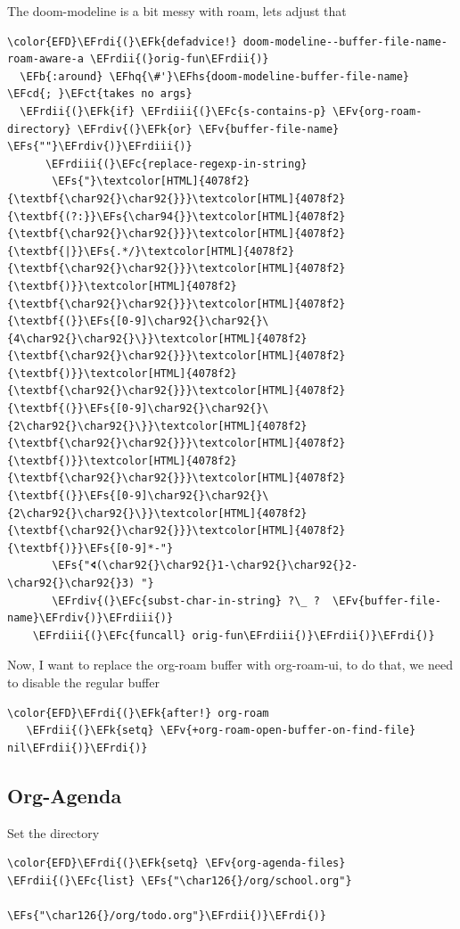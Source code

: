 \documentclass{scrartcl}
\newcommand{\EFk}[1]{\textcolor{EFk}{#1}} %
\newcommand{\EFs}[1]{\textcolor{EFs}{#1}} %
\newcommand{\EFb}[1]{\textcolor{EFb}{#1}} %
\newcommand{\EFct}[1]{\textcolor{EFct}{#1}} %
\newcommand{\EFc}[1]{\textcolor{EFc}{#1}} %
\newcommand{\EFv}[1]{\textcolor{EFv}{#1}} %
\newcommand{\EFcd}[1]{\textcolor{EFcd}{#1}} %
\newcommand{\EFhq}[1]{\textcolor{EFhq}{#1}} %
\newcommand{\EFhs}[1]{\textcolor{EFhs}{#1}} %
\newcommand{\EFrdi}[1]{\textcolor{EFrdi}{#1}} %
\newcommand{\EFrdii}[1]{\textcolor{EFrdii}{#1}} %
\newcommand{\EFrdiii}[1]{\textcolor{EFrdiii}{#1}} %
\newcommand{\EFrdiv}[1]{\textcolor{EFrdiv}{#1}} %
\begin{document}
The doom-modeline is a bit messy with roam, lets adjust that
\begin{Code}
\begin{Verbatim}[]
\color{EFD}\EFrdi{(}\EFk{defadvice!} doom-modeline--buffer-file-name-roam-aware-a \EFrdii{(}orig-fun\EFrdii{)}
  \EFb{:around} \EFhq{\#'}\EFhs{doom-modeline-buffer-file-name} \EFcd{; }\EFct{takes no args}
  \EFrdii{(}\EFk{if} \EFrdiii{(}\EFc{s-contains-p} \EFv{org-roam-directory} \EFrdiv{(}\EFk{or} \EFv{buffer-file-name} \EFs{""}\EFrdiv{)}\EFrdiii{)}
      \EFrdiii{(}\EFc{replace-regexp-in-string}
       \EFs{"}\textcolor[HTML]{4078f2}{\textbf{\char92{}\char92{}}}\textcolor[HTML]{4078f2}{\textbf{(?:}}\EFs{\char94{}}\textcolor[HTML]{4078f2}{\textbf{\char92{}\char92{}}}\textcolor[HTML]{4078f2}{\textbf{|}}\EFs{.*/}\textcolor[HTML]{4078f2}{\textbf{\char92{}\char92{}}}\textcolor[HTML]{4078f2}{\textbf{)}}\textcolor[HTML]{4078f2}{\textbf{\char92{}\char92{}}}\textcolor[HTML]{4078f2}{\textbf{(}}\EFs{[0-9]\char92{}\char92{}\{4\char92{}\char92{}\}}\textcolor[HTML]{4078f2}{\textbf{\char92{}\char92{}}}\textcolor[HTML]{4078f2}{\textbf{)}}\textcolor[HTML]{4078f2}{\textbf{\char92{}\char92{}}}\textcolor[HTML]{4078f2}{\textbf{(}}\EFs{[0-9]\char92{}\char92{}\{2\char92{}\char92{}\}}\textcolor[HTML]{4078f2}{\textbf{\char92{}\char92{}}}\textcolor[HTML]{4078f2}{\textbf{)}}\textcolor[HTML]{4078f2}{\textbf{\char92{}\char92{}}}\textcolor[HTML]{4078f2}{\textbf{(}}\EFs{[0-9]\char92{}\char92{}\{2\char92{}\char92{}\}}\textcolor[HTML]{4078f2}{\textbf{\char92{}\char92{}}}\textcolor[HTML]{4078f2}{\textbf{)}}\EFs{[0-9]*-"}
       \EFs{"🢔(\char92{}\char92{}1-\char92{}\char92{}2-\char92{}\char92{}3) "}
       \EFrdiv{(}\EFc{subst-char-in-string} ?\_ ?  \EFv{buffer-file-name}\EFrdiv{)}\EFrdiii{)}
    \EFrdiii{(}\EFc{funcall} orig-fun\EFrdiii{)}\EFrdii{)}\EFrdi{)}
\end{Verbatim}
\end{Code}


Now, I want to replace the org-roam buffer with org-roam-ui, to do that, we need
to disable the regular buffer
\begin{Code}
\begin{Verbatim}[]
\color{EFD}\EFrdi{(}\EFk{after!} org-roam
   \EFrdii{(}\EFk{setq} \EFv{+org-roam-open-buffer-on-find-file} nil\EFrdii{)}\EFrdi{)}
\end{Verbatim}
\end{Code}

\subsection{Org-Agenda}
\label{sec:org5af534e}
Set the directory
\begin{Code}
\begin{Verbatim}[]
\color{EFD}\EFrdi{(}\EFk{setq} \EFv{org-agenda-files} \EFrdii{(}\EFc{list} \EFs{"\char126{}/org/school.org"}
                             \EFs{"\char126{}/org/todo.org"}\EFrdii{)}\EFrdi{)}
\end{Verbatim}
\end{Code}
\end{document}
